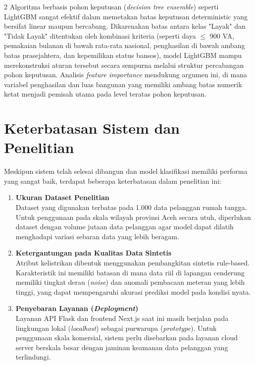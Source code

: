 \documentclass[12pt, a4paper, onecolumn, oneside]{report}
\begin{document}
\begin{spacing}{2}
Algoritma berbasis pohon keputusan (\textit{decision tree ensemble}) seperti LightGBM sangat efektif dalam memetakan batas keputusan deterministic yang bersifat linear maupun bercabang. Dikarenakan batas antara kelas "Layak" dan "Tidak Layak" ditentukan oleh kombinasi kriteria (seperti daya $\le$ 900 VA, pemakaian bulanan di bawah rata-rata nasional, penghasilan di bawah ambang batas prasejahtera, dan kepemilikan status bansos), model LightGBM mampu merekonstruksi aturan tersebut secara sempurna melalui struktur percabangan pohon keputusan. Analisis \textit{feature importance} mendukung argumen ini, di mana variabel penghasilan dan luas bangunan yang memiliki ambang batas numerik ketat menjadi pemisah utama pada level teratas pohon keputusan.

\section{Keterbatasan Sistem dan Penelitian}
Meskipun sistem telah selesai dibangun dan model klasifikasi memiliki performa yang sangat baik, terdapat beberapa keterbatasan dalam penelitian ini:
\begin{enumerate}
    \item \textbf{Ukuran Dataset Penelitian} \\
    Dataset yang digunakan terbatas pada 1.000 data pelanggan rumah tangga. Untuk penggunaan pada skala wilayah provinsi Aceh secara utuh, diperlukan dataset dengan volume jutaan data pelanggan agar model dapat dilatih menghadapi variasi sebaran data yang lebih beragam.
    \item \textbf{Ketergantungan pada Kualitas Data Sintetis} \\
    Atribut kelistrikan dibentuk menggunakan pembangkitan sintetis rule-based. Karakteristik ini memiliki batasan di mana data riil di lapangan cenderung memiliki tingkat derau (\textit{noise}) dan anomali pembacaan meteran yang lebih tinggi, yang dapat mempengaruhi akurasi prediksi model pada kondisi nyata.
    \item \textbf{Penyebaran Layanan (\textit{Deployment})} \\
    Layanan API Flask dan frontend Next.js saat ini masih berjalan pada lingkungan lokal (\textit{localhost}) sebagai purwarupa (\textit{prototype}). Untuk penggunaan skala komersial, sistem perlu disebarkan pada layanan cloud server berskala besar dengan jaminan keamanan data pelanggan yang terlindungi.
\end{enumerate}



\end{spacing}
\end{document}
